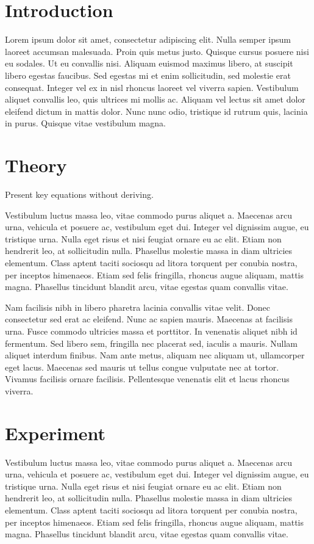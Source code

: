 \documentclass[a4paper,12pt]{article}
\begin{document}
\begin{multicols}{2}
	\section{Introduction}
		Lorem ipsum dolor sit amet, consectetur adipiscing elit. Nulla semper ipsum laoreet accumsan malesuada. Proin quis metus justo. Quisque cursus posuere nisi eu sodales. Ut eu convallis nisi. Aliquam euismod maximus libero, at suscipit libero egestas faucibus. Sed egestas mi et enim sollicitudin, sed molestie erat consequat. Integer vel ex in nisl rhoncus laoreet vel viverra sapien. Vestibulum aliquet convallis leo, quis ultrices mi mollis ac. Aliquam vel lectus sit amet dolor eleifend dictum in mattis dolor. Nunc nunc odio, tristique id rutrum quis, lacinia in purus. Quisque vitae vestibulum magna.
		
	\section{Theory}
		Present key equations without deriving.
		
		Vestibulum luctus massa leo, vitae commodo purus aliquet a. Maecenas arcu urna, vehicula et posuere ac, vestibulum eget dui. Integer vel dignissim augue, eu tristique urna. Nulla eget risus et nisi feugiat ornare eu ac elit. Etiam non hendrerit leo, at sollicitudin nulla. Phasellus molestie massa in diam ultricies elementum. Class aptent taciti sociosqu ad litora torquent per conubia nostra, per inceptos himenaeos. Etiam sed felis fringilla, rhoncus augue aliquam, mattis magna. Phasellus tincidunt blandit arcu, vitae egestas quam convallis vitae.
		
		Nam facilisis nibh in libero pharetra lacinia convallis vitae velit. Donec consectetur sed erat ac eleifend. Nunc ac sapien mauris. Maecenas at facilisis urna. Fusce commodo ultricies massa et porttitor. In venenatis aliquet nibh id fermentum. Sed libero sem, fringilla nec placerat sed, iaculis a mauris. Nullam aliquet interdum finibus. Nam ante metus, aliquam nec aliquam ut, ullamcorper eget lacus. Maecenas sed mauris ut tellus congue vulputate nec at tortor. Vivamus facilisis ornare facilisis. Pellentesque venenatis elit et lacus rhoncus viverra.
		
	\section{Experiment}
		Vestibulum luctus massa leo, vitae commodo purus aliquet a. Maecenas arcu urna, vehicula et posuere ac, vestibulum eget dui. Integer vel dignissim augue, eu tristique urna. Nulla eget risus et nisi feugiat ornare eu ac elit. Etiam non hendrerit leo, at sollicitudin nulla. Phasellus molestie massa in diam ultricies elementum. Class aptent taciti sociosqu ad litora torquent per conubia nostra, per inceptos himenaeos. Etiam sed felis fringilla, rhoncus augue aliquam, mattis magna. Phasellus tincidunt blandit arcu, vitae egestas quam convallis vitae.
		

\end{multicols}
\end{document}
